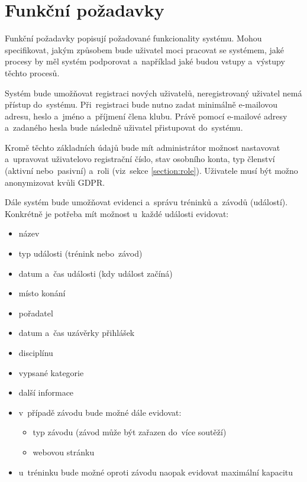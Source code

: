 \section{Funkční požadavky}
Funkční požadavky popisují požadované funkcionality systému. Mohou specifikovat, jakým způsobem bude uživatel moci pracovat se systémem, jaké procesy by měl systém podporovat a~například jaké budou vstupy a~výstupy těchto procesů. \cite{requirements}

\begin{enumerate}[label=\textcolor{decoration}{\textbf{F\arabic*}}, leftmargin=6mm]
	Systém bude umožňovat registraci nových uživatelů, neregistrovaný uživatel nemá přístup do~systému. Při~registraci bude nutno zadat minimálně e-mailovou adresu, heslo a~jméno a~příjmení člena klubu. Právě pomocí e-mailové adresy a~zadaného hesla bude následně uživatel přistupovat do~systému.

	Kromě těchto základních údajů bude mít administrátor možnost nastavovat a~upravovat uživatelovo registrační číslo, stav osobního konta, typ členství (aktivní nebo~pasivní) a~roli (viz~sekce \ref{section:role}). Uživatele musí být možno anonymizovat kvůli GDPR.

	Dále systém bude umožňovat evidenci a~správu tréninků a~závodů (událostí). Konkrétně je potřeba mít možnost u~každé události evidovat:
	\begin{itemize}
		\item název
		\item typ události (trénink nebo~závod)
		\item datum a~čas události (kdy událost začíná)
		\item místo konání
		\item pořadatel
		\item datum a~čas uzávěrky přihlášek
		\item disciplínu
		\item vypsané kategorie
		\item další informace
		\item v~případě závodu bude možné dále evidovat:
		\begin{itemize}
			\item typ závodu (závod může být zařazen do~více soutěží)
			\item webovou stránku
		\end{itemize}
		\item u~tréninku bude možné oproti závodu naopak evidovat maximální kapacitu
	\end{itemize}


\end{enumerate}
